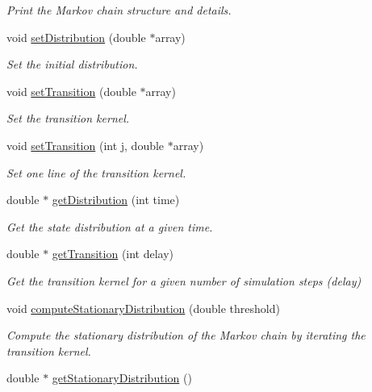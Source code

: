 \begin{DoxyCompactItemize}
\begin{DoxyCompactList}\small\item\em Print the Markov chain structure and details. \end{DoxyCompactList}\item 
void \hyperlink{class_markov_process_a2942db4262f73c20cc49bfebaf0df101}{set\+Distribution} (double $\ast$array)
\begin{DoxyCompactList}\small\item\em Set the initial distribution. \end{DoxyCompactList}\item 
void \hyperlink{class_markov_process_a687c9c983ac090f2ba40d028c6f04786}{set\+Transition} (double $\ast$array)
\begin{DoxyCompactList}\small\item\em Set the transition kernel. \end{DoxyCompactList}\item 
void \hyperlink{class_markov_process_a1dfca569e38a94214afc152c5b0c2567}{set\+Transition} (int j, double $\ast$array)
\begin{DoxyCompactList}\small\item\em Set one line of the transition kernel. \end{DoxyCompactList}\item 
\hypertarget{class_markov_process_afa7edaa775112df8dd4fc5007034d7e7}{}double $\ast$ \hyperlink{class_markov_process_afa7edaa775112df8dd4fc5007034d7e7}{get\+Distribution} (int time)\label{class_markov_process_afa7edaa775112df8dd4fc5007034d7e7}

\begin{DoxyCompactList}\small\item\em Get the state distribution at a given time. \end{DoxyCompactList}\item 
\hypertarget{class_markov_process_a39c87840da9b238d7c33bd5ad23d538d}{}double $\ast$ \hyperlink{class_markov_process_a39c87840da9b238d7c33bd5ad23d538d}{get\+Transition} (int delay)\label{class_markov_process_a39c87840da9b238d7c33bd5ad23d538d}

\begin{DoxyCompactList}\small\item\em Get the transition kernel for a given number of simulation steps (delay) \end{DoxyCompactList}\item 
void \hyperlink{class_markov_process_a77be24a3ccec6e19ba922f932d19e0fa}{compute\+Stationary\+Distribution} (double threshold)
\begin{DoxyCompactList}\small\item\em Compute the stationary distribution of the Markov chain by iterating the transition kernel. \end{DoxyCompactList}\item 
\hypertarget{class_markov_process_a6cd7abb0de322eb2ee133eda283388c3}{}double $\ast$ \hyperlink{class_markov_process_a6cd7abb0de322eb2ee133eda283388c3}{get\+Stationary\+Distribution} ()\label{class_markov_process_a6cd7abb0de322eb2ee133eda283388c3}


\end{DoxyCompactItemize}

